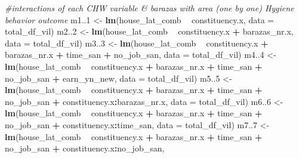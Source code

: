 \documentclass[
]{article}
\newenvironment{Shaded}{\begin{snugshade}}{\end{snugshade}}
\newcommand{\CommentTok}[1]{\textcolor[rgb]{0.56,0.35,0.01}{\textit{#1}}}
\newcommand{\DataTypeTok}[1]{\textcolor[rgb]{0.13,0.29,0.53}{#1}}
\newcommand{\DecValTok}[1]{\textcolor[rgb]{0.00,0.00,0.81}{#1}}
\newcommand{\KeywordTok}[1]{\textcolor[rgb]{0.13,0.29,0.53}{\textbf{#1}}}
\newcommand{\NormalTok}[1]{#1}
\newcommand{\OperatorTok}[1]{\textcolor[rgb]{0.81,0.36,0.00}{\textbf{#1}}}
\newcommand{\StringTok}[1]{\textcolor[rgb]{0.31,0.60,0.02}{#1}}
\begin{document}
\begin{Shaded}
\begin{Highlighting}[]
{{{{{{{{{{{{\CommentTok{#interactions of each CHW variable & barazas with area (one by one) Hygiene behavior outcome}
\NormalTok{m1..}\DecValTok{1}\NormalTok{ <-}\StringTok{ }\KeywordTok{lm}\NormalTok{(house_lat_comb }\OperatorTok{~}\StringTok{ }\NormalTok{constituency.x,}
            \DataTypeTok{data =}\NormalTok{ total_df_vil)}
\NormalTok{m2..}\DecValTok{2}\NormalTok{ <-}\StringTok{ }\KeywordTok{lm}\NormalTok{(house_lat_comb }\OperatorTok{~}\StringTok{ }\NormalTok{constituency.x }\OperatorTok{+}\StringTok{ }\NormalTok{barazas_nr.x,}
            \DataTypeTok{data =}\NormalTok{ total_df_vil)}
\NormalTok{m3..}\DecValTok{3}\NormalTok{ <-}\StringTok{ }\KeywordTok{lm}\NormalTok{(house_lat_comb }\OperatorTok{~}\StringTok{ }\NormalTok{constituency.x }\OperatorTok{+}\StringTok{ }\NormalTok{barazas_nr.x }\OperatorTok{+}\StringTok{ }\NormalTok{time_san }\OperatorTok{+}\StringTok{ }\NormalTok{no_job_san,}
            \DataTypeTok{data =}\NormalTok{ total_df_vil)}
\NormalTok{m4..}\DecValTok{4}\NormalTok{ <-}\StringTok{ }\KeywordTok{lm}\NormalTok{(house_lat_comb }\OperatorTok{~}\StringTok{ }\NormalTok{constituency.x }\OperatorTok{+}\StringTok{ }\NormalTok{barazas_nr.x }\OperatorTok{+}\StringTok{ }\NormalTok{time_san }\OperatorTok{+}\StringTok{ }\NormalTok{no_job_san }\OperatorTok{+}\StringTok{ }\NormalTok{earn_yn_new,}
            \DataTypeTok{data =}\NormalTok{ total_df_vil)}
\NormalTok{m5..}\DecValTok{5}\NormalTok{ <-}\StringTok{ }\KeywordTok{lm}\NormalTok{(house_lat_comb }\OperatorTok{~}\StringTok{ }\NormalTok{constituency.x }\OperatorTok{+}\StringTok{ }\NormalTok{barazas_nr.x }\OperatorTok{+}\StringTok{ }\NormalTok{time_san }\OperatorTok{+}\StringTok{ }\NormalTok{no_job_san }\OperatorTok{+}\StringTok{ }\NormalTok{constituency.x}\OperatorTok{:}\NormalTok{barazas_nr.x,}
            \DataTypeTok{data =}\NormalTok{ total_df_vil)}
\NormalTok{m6..}\DecValTok{6}\NormalTok{ <-}\StringTok{ }\KeywordTok{lm}\NormalTok{(house_lat_comb }\OperatorTok{~}\StringTok{ }\NormalTok{constituency.x }\OperatorTok{+}\StringTok{ }\NormalTok{barazas_nr.x }\OperatorTok{+}\StringTok{ }\NormalTok{time_san }\OperatorTok{+}\StringTok{ }\NormalTok{no_job_san }\OperatorTok{+}\StringTok{ }\NormalTok{constituency.x}\OperatorTok{:}\NormalTok{time_san,}
            \DataTypeTok{data =}\NormalTok{ total_df_vil)}
\NormalTok{m7..}\DecValTok{7}\NormalTok{ <-}\StringTok{ }\KeywordTok{lm}\NormalTok{(house_lat_comb }\OperatorTok{~}\StringTok{ }\NormalTok{constituency.x }\OperatorTok{+}\StringTok{ }\NormalTok{barazas_nr.x }\OperatorTok{+}\StringTok{ }\NormalTok{time_san }\OperatorTok{+}\StringTok{ }\NormalTok{no_job_san }\OperatorTok{+}\StringTok{ }\NormalTok{constituency.x}\OperatorTok{:}\NormalTok{no_job_san,}
}}}}}}}}}}}}
\end{Highlighting}
\end{Shaded}
\end{document}

